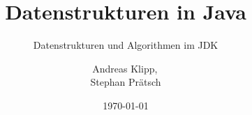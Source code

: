 \documentclass{beamer}
\begin{document}
\title{Datenstrukturen in Java}
\subtitle{Datenstrukturen und Algorithmen im JDK}
\author{Andreas Klipp,\, \\Stephan Prätsch}
\institute{}
\date{\today} 

\frame{\titlepage}








\end{document}
